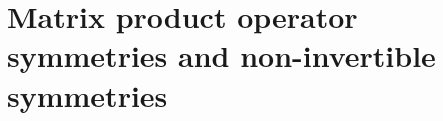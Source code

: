 
\chapter{Matrix product operator symmetries and non-invertible symmetries}%
\label{ch:mpo_symmetry_basics}

